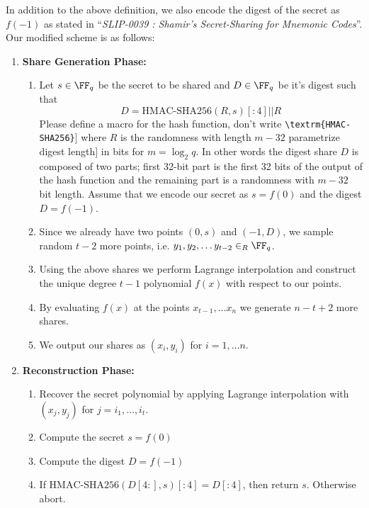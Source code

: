 \documentclass[envcountsame,runningheads,notitlepage]{llncs}
\DeclareRobustCommand{\michals}[2] {{\color{magenta}{$\big[$\scriptsize\textsf{Michal #1:}} #2$\big]$}}
\begin{document}
	In addition to the above definition, we also encode the digest of the secret as $f(-1)$ as stated in ``\textit{SLIP-0039 : Shamir's Secret-Sharing for Mnemonic Codes}''. Our modified scheme is as follows:
	\begin{enumerate}
		\item \textbf{Share Generation Phase:}  
			\begin{enumerate}
				\item Let $s \in \FF_q$ be the secret to be shared and $D \in \FF_q$ be it's digest such that 
				\begin{equation*}
				D = \textrm{HMAC-SHA256}(R,s)[:4] || R
				\end{equation*} 
				\michals{13.03}{Please define a macro for the hash function, don't write \texttt{\textbackslash textrm\{HMAC-SHA256\}}}
				where $R$ is the randomness with length $m-32$ \michals{13.3}{parametrize digest length} in bits for $m = \log_{2}{q}$. In other words the digest share $D$ is composed of two parts; first 32-bit part is the first 32 bits of the output of the hash function and the remaining part is a randomness with $m-32$ bit length. Assume that we encode our secret as $s = f(0)$ and the digest $D = f(-1)$.
				\item Since we already have two points $(0, s)$ and $(-1, D)$, we sample random $t-2$ more points, i.e. $y_{1}, y_{2}, \ldots y_{t-2} \in_{R} \FF_q$.
				\item Using the above shares we perform Lagrange interpolation and construct the unique degree $t-1$ polynomial $f (x)$ with respect to our points.  
				\item By evaluating $f (x)$ at the points $x_{t-1}, \ldots x_{n}$ we generate $n - t + 2$ more shares.
				\item We output our shares as $(x_{i},y_{i})$ for $i = 1, \ldots n$.
			\end{enumerate}
		\item \textbf{Reconstruction Phase:}  
			\begin{enumerate}
				\item Recover the secret polynomial by applying Lagrange interpolation with $(x_{j},y_{j})$ for $j = i_{1}, \ldots, i_{t}$.
				\item Compute the secret $s = f(0)$
				\item Compute the digest $D = f(-1)$
				\item If $\textrm{HMAC-SHA256}(D[4:],s)[:4] = D[:4]$, then return $s$. Otherwise abort. 
			\end{enumerate}
	\end{enumerate}
	
\end{document}
